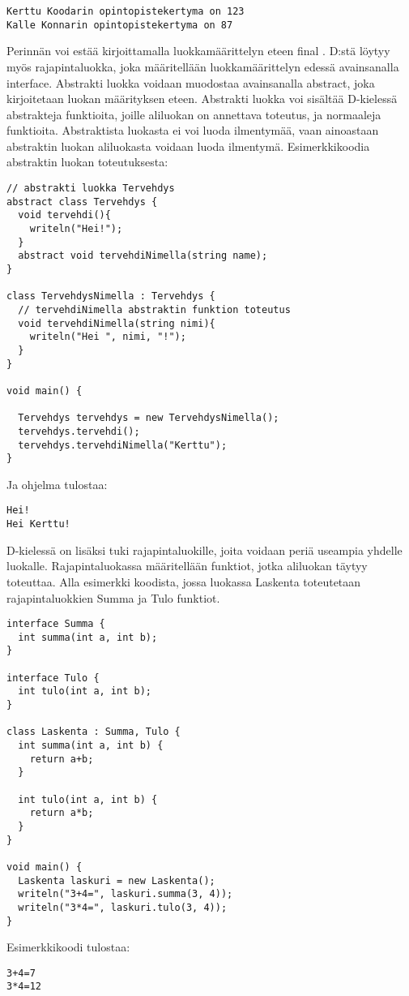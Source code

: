 \documentclass[11pt,oneside,a4paper]{article}
\begin{document}
\begin{verbatim}
Kerttu Koodarin opintopistekertyma on 123
Kalle Konnarin opintopistekertyma on 87
\end{verbatim}
Perinnän voi estää kirjoittamalla luokkamäärittelyn eteen final \cite{DLA13}.
D:stä löytyy myös rajapintaluokka, joka määritellään luokkamäärittelyn edessä
avainsanalla interface. 
Abstrakti luokka voidaan muodostaa avainsanalla abstract, joka kirjoitetaan
luokan määrityksen eteen. Abstrakti luokka voi sisältää D-kielessä abstrakteja
funktioita, joille aliluokan on annettava toteutus, ja normaaleja funktioita.
Abstraktista luokasta ei voi luoda ilmentymää, vaan ainoastaan abstraktin luokan
aliluokasta voidaan luoda ilmentymä. Esimerkkikoodia abstraktin luokan
toteutuksesta:
\begin{verbatim}
// abstrakti luokka Tervehdys
abstract class Tervehdys { 
  void tervehdi(){ 
    writeln("Hei!"); 
  } 
  abstract void tervehdiNimella(string name); 
} 

class TervehdysNimella : Tervehdys { 
  // tervehdiNimella abstraktin funktion toteutus
  void tervehdiNimella(string nimi){ 
    writeln("Hei ", nimi, "!"); 
  } 
} 

void main() {

  Tervehdys tervehdys = new TervehdysNimella(); 
  tervehdys.tervehdi(); 
  tervehdys.tervehdiNimella("Kerttu"); 
}
\end{verbatim}
Ja ohjelma tulostaa:
\begin{verbatim}
Hei!
Hei Kerttu!
\end{verbatim}

D-kielessä on lisäksi tuki rajapintaluokille, joita voidaan periä useampia
yhdelle luokalle. Rajapintaluokassa määritellään funktiot, jotka aliluokan
täytyy toteuttaa. Alla esimerkki koodista, jossa luokassa Laskenta toteutetaan
rajapintaluokkien Summa ja Tulo funktiot.

\begin{verbatim}
interface Summa { 
  int summa(int a, int b); 
} 

interface Tulo {
  int tulo(int a, int b);
}

class Laskenta : Summa, Tulo { 
  int summa(int a, int b) { 
    return a+b;
  } 

  int tulo(int a, int b) {
    return a*b;
  }
} 

void main() {
  Laskenta laskuri = new Laskenta();
  writeln("3+4=", laskuri.summa(3, 4));
  writeln("3*4=", laskuri.tulo(3, 4));
}
\end{verbatim}
Esimerkkikoodi tulostaa:
\begin{verbatim}
3+4=7
3*4=12
\end{verbatim}
\end{document}
